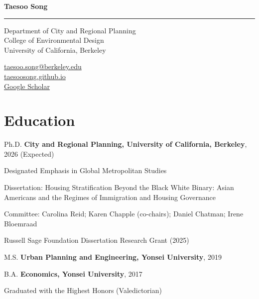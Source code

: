 \documentclass[11pt,letterpaper]{article}
\newcommand{\term}[1]{(#1)}
\newcommand{\namefont}[1]{{\normalfont\bfseries\Huge #1}}
\begin{document}
\raggedright

\namefont{Taesoo Song}
\noindent\rule{\linewidth}{0.8pt}

\begin{minipage}[t]{0.66\textwidth}
Department of City and Regional Planning\\
College of Environmental Design\\
University of California, Berkeley
\end{minipage}
\begin{minipage}[t]{0.33\textwidth}
\raggedleft
\href{mailto:taesoo.song@berkeley.edu}{taesoo.song@berkeley.edu}\\
\href{https://taesoosong.github.io}{taesoosong.github.io}\\
\href{https://scholar.google.com/citations?user=xM5Rc-EAAAAJ}{Google Scholar}
\end{minipage}

\section{Education}
\begin{tablist}
  \item[Ph.D.] \tab{}\textbf{City and Regional Planning, University of California, Berkeley}, 2026 (Expected)
    \begin{subpoints}
      \item Designated Emphasis in Global Metropolitan Studies
    \end{subpoints}
    \begin{subpoints2}
      \item Dissertation: Housing Stratification Beyond the Black White Binary: Asian Americans and the Regimes of Immigration and Housing Governance
      \item Committee: Carolina Reid; Karen Chapple (co-chairs); Daniel Chatman; Irene Bloemraad
      \item Russell Sage Foundation Dissertation Research Grant \term{2025}
    \end{subpoints2}

  \item[M.S.] \tab{}\textbf{Urban Planning and Engineering, Yonsei University}, 2019

  \item[B.A.] \tab{}\textbf{Economics, Yonsei University}, 2017
    \begin{subpoints}
      \item Graduated with the Highest Honors \term{Valedictorian}
    \end{subpoints}
\end{tablist}
\end{document}
